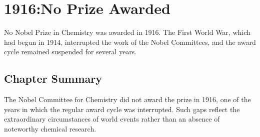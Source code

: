 \chapter{1916:No Prize Awarded}
\label{chap:chemistry1916}

No Nobel Prize in Chemistry was awarded in 1916. The First World War, which had begun in 1914, interrupted the work of the Nobel Committees, and the award cycle remained suspended for several years.

\section*{Chapter Summary}

The Nobel Committee for Chemistry did not award the prize in 1916, one of the years in which the regular award cycle was interrupted. Such gaps reflect the extraordinary circumstances of world events rather than an absence of noteworthy chemical research.
